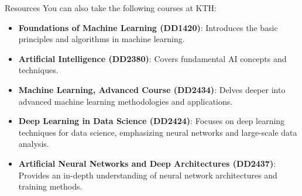 \documentclass{beamer}
\begin{document}
\begin{frame}{Resources}
    You can also take the following courses at KTH:
    \begin{itemize}
        \item \textbf{Foundations of Machine Learning (DD1420)}: Introduces the basic principles and algorithms in machine learning.
        \item \textbf{Artificial Intelligence (DD2380)}: Covers fundamental AI concepts and techniques.
        \item \textbf{Machine Learning, Advanced Course (DD2434)}: Delves deeper into advanced machine learning methodologies and applications.
        \item \textbf{Deep Learning in Data Science (DD2424)}: Focuses on deep learning techniques for data science, emphasizing neural networks and large-scale data analysis.
        \item \textbf{Artificial Neural Networks and Deep Architectures (DD2437)}: Provides an in-depth understanding of neural network architectures and training methods.
    \end{itemize}
\end{frame}
\end{document}
